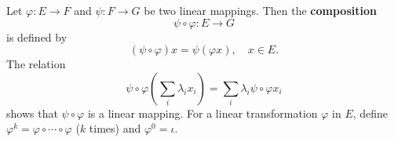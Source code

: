 Let $\varphi: E \to F$ and $\psi: F \to G$ be two linear mappings. Then the \textbf{composition}
$$\psi \circ \varphi: E \to G$$
is defined by
$$(\psi \circ \varphi) x = \psi(\varphi x), \quad x \in E.$$
The relation
$$\psi \circ \varphi \left( \sum_i \lambda_i x_i \right) = \sum_i \lambda_i \psi \circ \varphi x_i$$
shows that $\psi \circ \varphi$ is a linear mapping. For a linear transformation $\varphi$ in $E$, define $\varphi^k = \varphi \circ \cdots \circ \varphi$ ($k$ times) and $\varphi^0 = \iota$.
